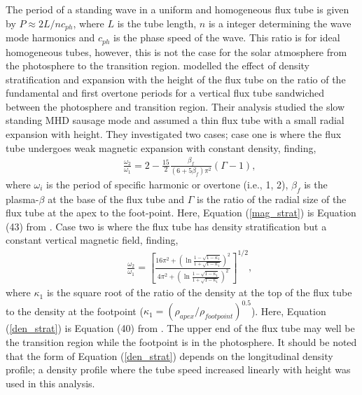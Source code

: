     The period of a standing wave in a uniform and homogeneous flux tube is given by $P \approx 2L/nc_{ph}$, where $L$ is the tube length, $n$ is a integer determining the wave mode harmonics and $c_{ph}$ is the phase speed of the wave.
    This ratio is for ideal homogeneous tubes, however, this is not the case for the solar atmosphere from the photosphere to the transition region.
    \citet{luna-cardozo} modelled the effect of density stratification and expansion with the height of the flux tube on the ratio of the fundamental and first overtone periods for a vertical flux tube sandwiched between the photosphere and transition region.
    Their analysis studied the slow standing MHD sausage mode and assumed a thin flux tube with a small radial expansion with height. 
    They investigated two cases; case one is where the flux tube undergoes weak magnetic expansion with constant density, finding,  
    \begin{align}
        &&\frac{\omega_{2}}{\omega_{1}}= 2 - \frac{15}{2}\frac{\beta_{f}}{(6+5\beta_{f})\pi^{2}}(\Gamma-1),
        \label{mag_strat}
    \end{align}
    where $\omega_{i}$ is the period of specific harmonic or overtone (i.e., 1, 2), $\beta_{f}$ is the plasma-$\beta$ at the base of the flux tube and $\Gamma$ is the ratio of the radial size of the flux tube at the apex to the foot-point.
    Here, Equation (\ref{mag_strat}) is Equation (43) from \cite{luna-cardozo}.
    Case two is where the flux tube has density stratification but a constant vertical magnetic field, finding,
    \begin{align}
        &&\frac{\omega_{2}}{\omega_{1}}= \left[\frac{16\pi^{2} + \displaystyle\left(\ln\frac{1 - \sqrt{1 - \kappa_{1}}}{1 + \sqrt{1 - \kappa_{1}}}\right)^{2}}{4\pi^2 + \displaystyle\left(\ln\frac{1 - \sqrt{1 - \kappa_{1}}}{1 + \sqrt{1 - \kappa_{1}}}\right)^{2}} \right]^{1/2},
        \label{den_strat}
    \end{align} 
	where $\kappa_{1}$ is the square root of the ratio of the density at the top of the flux tube to the density at the footpoint ($\kappa_{1} = (\rho_{apex}/\rho_{footpoint})^{0.5}$).
    Here, Equation (\ref{den_strat}) is Equation (40) from \cite{luna-cardozo}.
    The upper end of the flux tube may well be the transition region while the footpoint is in the photosphere.
    It should be noted that the form of Equation (\ref{den_strat}) depends on the longitudinal density profile; a density profile where the tube speed increased linearly with height was used in this analysis.
 
